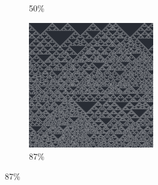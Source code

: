 \documentclass[12pt, fleqn]{report}                             %
\theoremstyle{break}                                            %
\begin{document}
\begin{figure}[ht!]
\begin{subfigure}[b]{0.4\linewidth}
          \caption{50\%}
        \end{subfigure}
        \begin{subfigure}[b]{0.4\linewidth}
          \includegraphics[width=0.6\textwidth]{Images/18/d.png}
          \caption{87\%}
        \end{subfigure}
      \end{figure}
\end{document}
